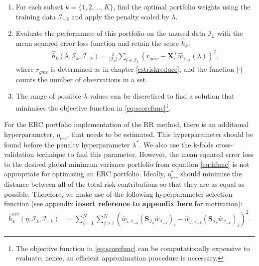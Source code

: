 \documentclass[
]{article}
\begin{document}
\begin{enumerate}
\def\labelenumi{\arabic{enumi}.}
\item
  For each subset \(k = \{1, 2, ..., K\}\), find the optimal portfolio weights using the training data \(\mathcal{I}_{-k}\) and apply the penalty scaled by \(\lambda\).
\item
  Evaluate the performance of this portfolio on the unused data \(\mathcal{I}_k\) with the mean squared error loss function and retain the score \(\hat{h}_k\):
  \begin{align}
  \hat{h}_k (\lambda, \mathcal{I}_k, \mathcal{I}_{-k}) = \frac{1}{|\mathcal{I}_k|} \sum_{i \in \mathcal{I}_k} (\bar{r}_{gmv} - \textbf{X}_i^\intercal \hat{w}_{\mathcal{I}_{-k}}(\lambda))^2, \label{eq:hfunc}
  \end{align}
  where \(\bar{r}_{gmv}\) is determined as in chapter \ref{estriskreduce}, and the function \(|\cdot|\)
  counts the number of observations in a set.
\item
  The range of possible \(\lambda\) values can be discretised to find a solution that minimises the
  objective function in \eqref{eq:scorefunc}\footnote{The objective function in \eqref{eq:scorefunc} can
    be computationally expensive to evaluate; hence, an efficient approximation procedure is necessary.}.
\end{enumerate}

For the ERC portfolio implementation of the RR method, there is an additional hyperparameter,
\(\eta_{erc}\), that needs to be estimated. This hyperparameter should be found before the penalty
hyperparameter \(\lambda^*\). We also use the k-folds cross-validation technique to find this parameter.
However, the mean squared error loss to the desired global minimum variance portfolio from equation
\eqref{eq:hfunc} is not appropriate for optimising an ERC portfolio. Ideally, \(\eta_{erc}^*\) should
minimise the distance between all of the total risk contributions so that they are as equal as
possible. Therefore, we make use of the following hyperparameter selection function (see appendix
\textbf{insert reference to appendix here} for motivation):
\begin{align}
\hat{h}_k^{erc} (\eta, \mathcal{I}_k, \mathcal{I}_{-k}) & = \sum_{i = 1}^N  \sum_{j \geq i}^N(\hat{w}_{i, \mathcal{I}_{-k}}(\textbf{S}_{\mathcal{I}_k} \hat{w}_{\mathcal{I}_{-k}})_i - \hat{w}_{j, \mathcal{I}_{-k}}(\textbf{S}_{\mathcal{I}_k} \hat{w}_{\mathcal{I}_{-k}})_j )^2.
\end{align}
\end{document}
